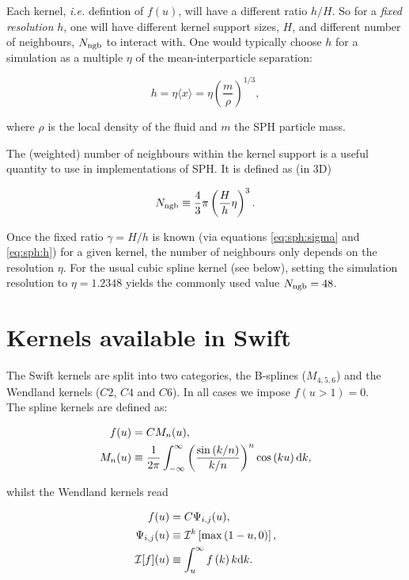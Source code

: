 \documentclass[a4paper]{mnras}
\newcommand{\swift}{{\sc Swift}\xspace}
\begin{document}
Each kernel, {\it i.e.} defintion of $f(u)$, will have a different
ratio $h/H$. So for a \emph{fixed resolution} $h$, one will have
different kernel support sizes, $H$, and different number of
neighbours, $N_{\rm ngb}$ to interact with. One would typically choose
$h$ for a simulation as a multiple $\eta$ of the mean-interparticle
separation:

\begin{equation}
  h = \eta \langle x \rangle = \eta \left(\frac{m}{\rho}\right)^{1/3},
\end{equation}

where $\rho$ is the local density of the fluid and $m$ the SPH
particle mass. 

The (weighted) number of neighbours within the kernel support is a
useful quantity to use in implementations of SPH. It is defined as (in
3D)

\begin{equation}
  N_{\rm ngb} \equiv \frac{4}{3}\pi \left(\frac{H}{h}\eta\right)^3.
\end{equation}

Once the fixed ratio $\gamma= H/h$ is known (via equations
\ref{eq:sph:sigma} and \ref{eq:sph:h}) for a given kernel, the number
of neighbours only depends on the resolution $\eta$.  For the usual
cubic spline kernel (see below), setting the simulation resolution to
$\eta=1.2348$ yields the commonly used value $N_{\rm ngb} = 48$.

\section{Kernels available in \swift}

The \swift kernels are split into two categories, the B-splines
($M_{4,5,6}$) and the Wendland kernels ($C2$, $C4$ and $C6$). In all
cases we impose $f(u>1) = 0$.\\

The spline kernels are defined as:

\begin{align}
  f(u) &= C M_n(u), \\
  M_n(u) &\equiv \frac{1}{2\pi}
  \int_{-\infty}^{\infty}
  \left(\frac{\sin\left(k/n\right)}{k/n}\right)^n\cos\left(ku\right){\rm
  d}k,
\end{align}

whilst the Wendland kernels read

\begin{align}
  f(u) &= C \Psi_{i,j}(u), \\
  \Psi_{i,j}(u) &\equiv \mathcal{I}^k\left[\max\left(1-u,0\right)\right],\\
  \mathcal{I}[f](u) &\equiv \int_u^\infty f\left(k\right)k{\rm d}k.
\end{align}
\end{document}
